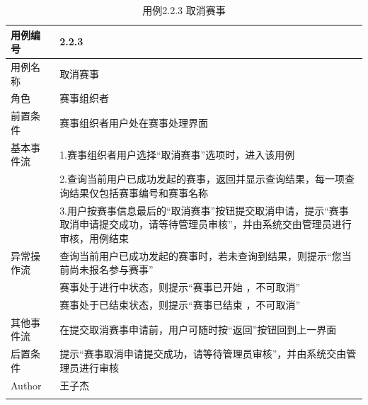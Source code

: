 \documentclass[a4paper,UTF8]{article}
\begin{document}
\begin{table}[H]
	\begin{center}
		\caption{用例2.2.3 取消赛事}
		\label{table:Tab_uc223}
		\begin{tabular}{|p{}|p{}|}
			\hline\noalign{\smallskip}
			用例编号 & 2.2.3\\
			\hline
			用例名称 &  取消赛事\\
			\hline
			角色 & 赛事组织者\\
			\hline
			前置条件 & 赛事组织者用户处在赛事处理界面\\
			\hline
			基本事件流 & 1.赛事组织者用户选择“取消赛事”选项时，进入该用例 \\& 2.查询当前用户已成功发起的赛事，返回并显示查询结果，每一项查询结果仅包括赛事编号和赛事名称 \\& 3.用户按赛事信息最后的“取消赛事”按钮提交取消申请，提示“赛事取消申请提交成功，请等待管理员审核”，并由系统交由管理员进行审核，用例结束\\
			\hline
			异常操作流 & 查询当前用户已成功发起的赛事时，若未查询到结果，则提示“您当前尚未报名参与赛事” \\& 赛事处于进行中状态，则提示“赛事已开始 ，不可取消” \\& 赛事处于已结束状态，则提示“赛事已结束 ，不可取消” \\
			\hline
			其他事件流 & 在提交取消赛事申请前，用户可随时按“返回”按钮回到上一界面\\
			\hline
			后置条件 & 提示“赛事取消申请提交成功，请等待管理员审核”，并由系统交由管理员进行审核\\
			\hline
			Author & 王子杰 \\
			\noalign{\smallskip}
			\hline
			\noalign{\smallskip}
		\end{tabular}
	\end{center}
\end{table}
\end{document}
